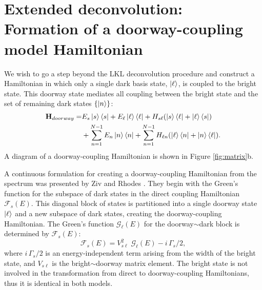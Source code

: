 \documentclass[12pt]{mitthesis}
\begin{document}

\section{Extended deconvolution: \\
  Formation of a doorway-coupling model Hamiltonian}

We wish to go a step beyond the LKL deconvolution procedure and
construct a Hamiltonian in which only a single dark basis state,
$\mathinner{|{\ell}\rangle}$, is coupled to the bright state.  This doorway state
mediates all coupling between the bright state and the set of
remaining dark states $\lbrace \mathinner{|{n}\rangle} \rbrace$:
\begin{equation}
  \begin{split}
    \mathbf{H}_{doorway} =&
    E_s\mathinner{|{s}\rangle}\mathinner{\langle{s}|}
    + E_{\ell}\mathinner{|{\ell}\rangle}\mathinner{\langle{\ell}|}
    + H_{s\ell} ( \mathinner{|{s}\rangle}\mathinner{\langle{\ell}|} + \mathinner{|{\ell}\rangle}\mathinner{\langle{s}|} ) \\
    & + \sum_{n=1}^{N-1} E_n\mathinner{|{n}\rangle}\mathinner{\langle{n}|}
    + \sum_{n=1}^{N-1} H_{\ell n} (\mathinner{|{\ell}\rangle}\mathinner{\langle{n}|} + \mathinner{|{n}\rangle}\mathinner{\langle{\ell}|}).
  \end{split}
\end{equation}
A diagram of a doorway-coupling Hamiltonian is shown in Figure
\ref{fig:matrix}b.

A continuous formulation for creating a doorway-coupling Hamiltonian
from the spectrum was presented by Ziv and Rhodes \cite{ziv76}.  They
begin with the Green's function for the subspace of dark states in the
direct coupling Hamiltonian $\mathcal{F}_s(E)$.  This diagonal block
of states is partitioned into a single doorway state $\mathinner{|{\ell}\rangle}$ and
a new subspace of dark states, creating the doorway-coupling
Hamiltonian.  The Green's function $\mathcal{G}_{\ell}(E)$ for the
doorway$\sim$dark block is determined by $\mathcal{F}_s(E)$:
\begin{equation}
  \label{eq:green-doorway}
  \mathcal{F}_s(E) = V_{s\ell}^2 \; \mathcal{G}_{\ell}(E) - i \, \Gamma_s / 2,
\end{equation}
where $i \, \Gamma_s / 2$ is an energy-independent term arising from
the width of the bright state, and $V_{s\ell}$ is the
bright$\sim$doorway matrix element.  The bright state is not
involved in the transformation from direct to doorway-coupling
Hamiltonians, thus it is identical in both models. 
\end{document}
